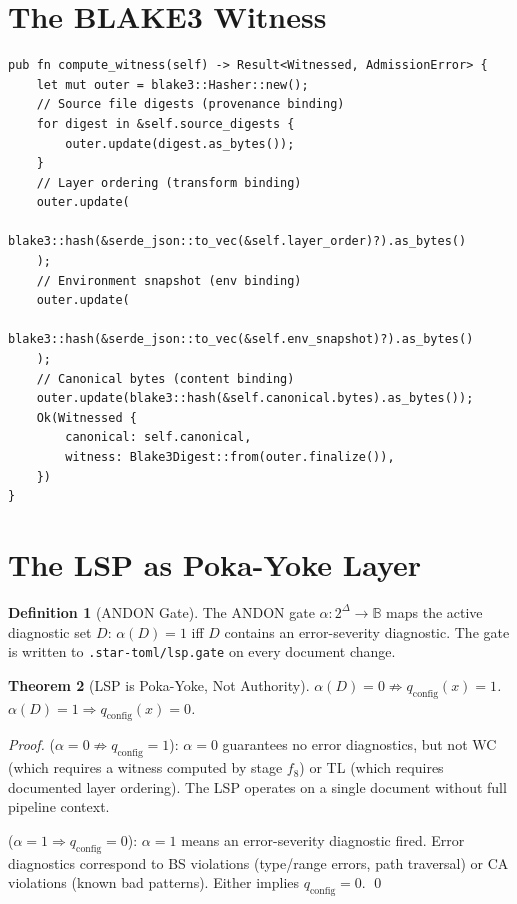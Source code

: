 \documentclass[12pt, letterpaper]{report}
\theoremstyle{plain}
\newtheorem{theorem}{Theorem}[chapter]
\theoremstyle{definition}
\newtheorem{definition}[theorem]{Definition}
\theoremstyle{remark}
\newcommand{\BB}{\mathbb{B}}
\newcommand{\qc}{q_{\mathrm{config}}}
\begin{document}
\section{The BLAKE3 Witness}

\begin{lstlisting}[caption={Implementation of $\omega(x, \ell, e)$.
The witness binds source digests, layer ordering, environment snapshot,
and canonical bytes. No group-homomorphism property is claimed or used;
only collision resistance and canonical binding matter.}]
pub fn compute_witness(self) -> Result<Witnessed, AdmissionError> {
    let mut outer = blake3::Hasher::new();
    // Source file digests (provenance binding)
    for digest in &self.source_digests {
        outer.update(digest.as_bytes());
    }
    // Layer ordering (transform binding)
    outer.update(
        blake3::hash(&serde_json::to_vec(&self.layer_order)?).as_bytes()
    );
    // Environment snapshot (env binding)
    outer.update(
        blake3::hash(&serde_json::to_vec(&self.env_snapshot)?).as_bytes()
    );
    // Canonical bytes (content binding)
    outer.update(blake3::hash(&self.canonical.bytes).as_bytes());
    Ok(Witnessed {
        canonical: self.canonical,
        witness: Blake3Digest::from(outer.finalize()),
    })
}
\end{lstlisting}

\section{The LSP as Poka-Yoke Layer}

\begin{definition}[ANDON Gate]
The ANDON gate $\alpha : 2^\Delta \to \BB$ maps the active diagnostic set $D$:
$\alpha(D) = 1$ iff $D$ contains an error-severity diagnostic.
The gate is written to \texttt{.star-toml/lsp.gate} on every document change.
\end{definition}

\begin{theorem}[LSP is Poka-Yoke, Not Authority]
\label{thm:poka-yoke}
$\alpha(D) = 0 \not\Rightarrow \qc(x) = 1$.
$\alpha(D) = 1 \Rightarrow \qc(x) = 0$.
\end{theorem}

\begin{proof}
($\alpha = 0 \not\Rightarrow \qc = 1$):
$\alpha = 0$ guarantees no error diagnostics, but not WC (which requires
a witness computed by stage $f_8$) or TL (which requires documented
layer ordering). The LSP operates on a single document without full
pipeline context.

($\alpha = 1 \Rightarrow \qc = 0$):
$\alpha = 1$ means an error-severity diagnostic fired.
Error diagnostics correspond to BS violations (type/range errors, path traversal)
or CA violations (known bad patterns).
Either implies $\qc = 0$. \qed
\end{proof}
\end{document}
